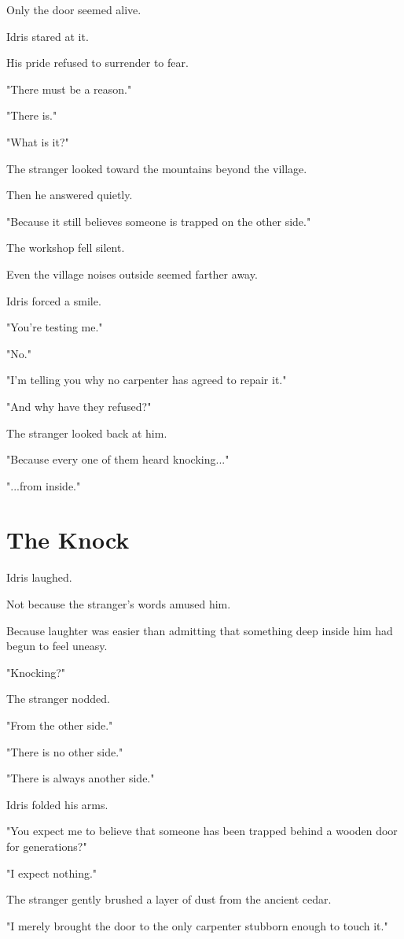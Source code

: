 \documentclass[12pt,openany]{book}
\begin{document}
Only the door seemed alive.

Idris stared at it.

His pride refused to surrender to fear.

"There must be a reason."

"There is."

"What is it?"

The stranger looked toward the mountains beyond the village.

Then he answered quietly.

"Because it still believes someone is trapped on the other side."

The workshop fell silent.

Even the village noises outside seemed farther away.

Idris forced a smile.

"You're testing me."

"No."

"I'm telling you why no carpenter has agreed to repair it."

"And why have they refused?"

The stranger looked back at him.

"Because every one of them heard knocking..."

"...from inside."
\section*{The Knock}

Idris laughed.

Not because the stranger's words amused him.

Because laughter was easier than admitting that something deep inside him had begun to feel uneasy.

"Knocking?"

The stranger nodded.

"From the other side."

"There is no other side."

"There is always another side."

Idris folded his arms.

"You expect me to believe that someone has been trapped behind a wooden door for generations?"

"I expect nothing."

The stranger gently brushed a layer of dust from the ancient cedar.

"I merely brought the door to the only carpenter stubborn enough to touch it."
\end{document}
